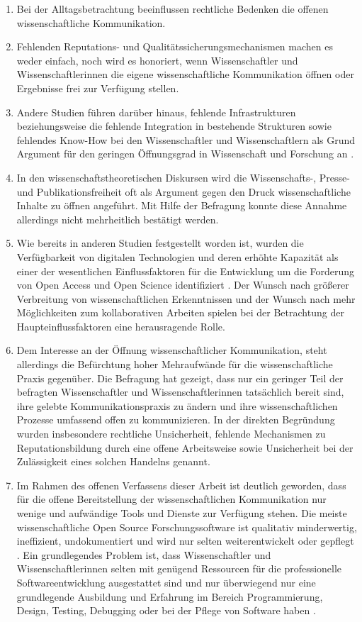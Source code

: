 \begin{enumerate}
\item Bei der Alltagsbetrachtung beeinflussen rechtliche Bedenken die offenen wissenschaftliche Kommunikation.
\item Fehlenden Reputations- und Qualitätssicherungsmechanismen machen es weder einfach, noch wird es honoriert, wenn Wissenschaftler und Wissenschaftlerinnen die eigene wissenschaftliche Kommunikation öffnen oder Ergebnisse frei zur Verfügung stellen.
\item Andere Studien führen darüber hinaus, fehlende Infrastrukturen beziehungsweise die fehlende Integration in bestehende Strukturen sowie fehlendes Know-How bei den Wissenschaftler und Wissenschaftlern als Grund Argument für den geringen Öffnungsgrad in Wissenschaft und Forschung an \cite{eu_open_science_2015}.
\item In den wissenschaftstheoretischen Diskursen wird die Wissenschafts-, Presse- und Publikationsfreiheit oft als Argument gegen den Druck wissenschaftliche Inhalte zu öffnen angeführt. Mit Hilfe der Befragung konnte diese Annahme allerdings nicht mehrheitlich bestätigt werden.
\item Wie bereits in anderen Studien festgestellt worden ist, wurden die Verfügbarkeit von digitalen Technologien und deren erhöhte Kapazität als einer der wesentlichen Einflussfaktoren für die Entwicklung um die Forderung von Open Access und Open Science identifiziert \cite{eu_open_science_2015}. Der Wunsch nach größerer Verbreitung von wissenschaftlichen Erkenntnissen und der Wunsch nach mehr Möglichkeiten zum kollaborativen Arbeiten spielen bei der Betrachtung der Haupteinflussfaktoren eine herausragende Rolle.
\item Dem Interesse an der Öffnung wissenschaftlicher Kommunikation, steht allerdings die Befürchtung hoher Mehraufwände für die wissenschaftliche Praxis gegenüber. Die Befragung hat gezeigt, dass nur ein geringer Teil der befragten Wissenschaftler und Wissenschaftlerinnen tatsächlich bereit sind, ihre gelebte Kommunikationspraxis zu ändern und ihre wissenschaftlichen Prozesse umfassend offen zu kommunizieren. In der direkten Begründung wurden insbesondere rechtliche Unsicherheit, fehlende Mechanismen zu Reputationsbildung durch eine offene Arbeitsweise sowie Unsicherheit bei der Zulässigkeit eines solchen Handelns genannt.
\item Im Rahmen des offenen Verfassens dieser Arbeit ist deutlich geworden, dass für die offene Bereitstellung der wissenschaftlichen Kommunikation nur wenige und aufwändige Tools und Dienste zur Verfügung stehen. Die meiste wissenschaftliche Open Source Forschungssoftware ist qualitativ minderwertig, ineffizient, undokumentiert und wird nur selten weiterentwickelt oder gepflegt \cite{hey_2015_open}. Ein grundlegendes Problem ist, dass Wissenschaftler und Wissenschaftlerinnen selten mit genügend Ressourcen für die professionelle Softwareentwicklung ausgestattet sind und nur überwiegend nur eine grundlegende Ausbildung und Erfahrung im Bereich Programmierung, Design, Testing, Debugging oder bei der Pflege von Software haben \cite{hey_2015_open}.

\end{enumerate}
